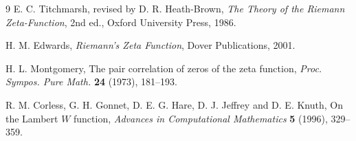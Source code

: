 \documentclass[11pt]{article}
\theoremstyle{definition}
\begin{document}
\begin{thebibliography}{9}
E. C. Titchmarsh, revised by D. R. Heath-Brown,
\emph{The Theory of the Riemann Zeta-Function}, 2nd ed.,
Oxford University Press, 1986.

H. M. Edwards,
\emph{Riemann's Zeta Function},
Dover Publications, 2001.

H. L. Montgomery,
The pair correlation of zeros of the zeta function,
\emph{Proc. Sympos. Pure Math.} \textbf{24} (1973), 181--193.

R. M. Corless, G. H. Gonnet, D. E. G. Hare, D. J. Jeffrey and D. E. Knuth,
On the Lambert $W$ function,
\emph{Advances in Computational Mathematics} \textbf{5} (1996), 329--359.
\end{thebibliography}
\end{document}

